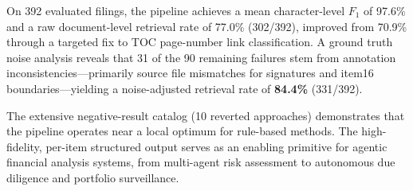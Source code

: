 \documentclass[11pt,a4paper]{article}
\begin{document}
On 392 evaluated filings, the pipeline achieves a mean character-level $F_1$ of 97.6\% and a raw document-level retrieval rate of 77.0\% (302/392), improved from 70.9\% through a targeted fix to TOC page-number link classification. A ground truth noise analysis reveals that 31 of the 90 remaining failures stem from annotation inconsistencies---primarily source file mismatches for signatures and item16 boundaries---yielding a noise-adjusted retrieval rate of \textbf{84.4\%} (331/392).

The extensive negative-result catalog (10 reverted approaches) demonstrates that the pipeline operates near a local optimum for rule-based methods. The high-fidelity, per-item structured output serves as an enabling primitive for agentic financial analysis systems, from multi-agent risk assessment to autonomous due diligence and portfolio surveillance.
\end{document}
